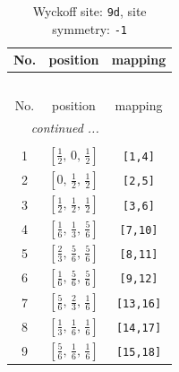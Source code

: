 \documentclass[fleqn,8pt]{jsarticle}
\begin{document}
\begin{longtable}{ccc}
\caption{Wyckoff site: {\tt 9d}, site symmetry: {\tt -1}}
 \\
 \hline \hline
No. & position & mapping \\ \hline \endfirsthead

\multicolumn{2}{l}{\tablename\ \thetable{}} \\
 \hline \hline
No. & position & mapping \\ \hline \endhead

 \hline \hline
\multicolumn{2}{r}{\footnotesize\it continued ...} \\ \endfoot

 \hline \hline
\multicolumn{2}{r}{} \\ \endlastfoot

1 & $\left[ \frac{1}{2},\, 0,\, \frac{1}{2} \right]$ & {\tt [1,4]} \\ \hline
2 & $\left[ 0,\, \frac{1}{2},\, \frac{1}{2} \right]$ & {\tt [2,5]} \\ \hline
3 & $\left[ \frac{1}{2},\, \frac{1}{2},\, \frac{1}{2} \right]$ & {\tt [3,6]} \\ \hline
4 & $\left[ \frac{1}{6},\, \frac{1}{3},\, \frac{5}{6} \right]$ & {\tt [7,10]} \\ \hline
5 & $\left[ \frac{2}{3},\, \frac{5}{6},\, \frac{5}{6} \right]$ & {\tt [8,11]} \\ \hline
6 & $\left[ \frac{1}{6},\, \frac{5}{6},\, \frac{5}{6} \right]$ & {\tt [9,12]} \\ \hline
7 & $\left[ \frac{5}{6},\, \frac{2}{3},\, \frac{1}{6} \right]$ & {\tt [13,16]} \\ \hline
8 & $\left[ \frac{1}{3},\, \frac{1}{6},\, \frac{1}{6} \right]$ & {\tt [14,17]} \\ \hline
9 & $\left[ \frac{5}{6},\, \frac{1}{6},\, \frac{1}{6} \right]$ & {\tt [15,18]} \\
\end{longtable}
\renewcommand{\arraystretch}{1.2}
\end{document}
